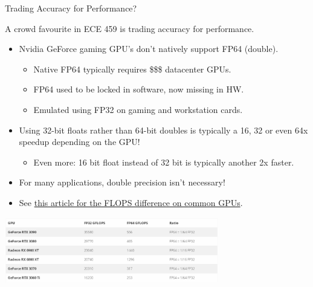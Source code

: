 \begin{frame}{Trading Accuracy for Performance?}
	
	A crowd favourite in ECE 459 is trading accuracy for performance.
	
		\begin{itemize}
		\item Nvidia GeForce gaming GPU's don't natively support FP64 (double).
		\begin{itemize}
			\item Native FP64 typically requires \$\$\$ datacenter GPUs.
			\item FP64 used to be locked in software, now missing in HW.
			\item Emulated using FP32 on gaming and workstation cards.
		\end{itemize}
		\item Using 32-bit floats rather than 64-bit doubles is typically a 16, 32 or even 64x speedup depending on the GPU!
		\begin{itemize}
			\item Even more: 16 bit float instead of 32 bit is typically another 2x faster.
		\end{itemize}
		\item For many applications, double precision isn't necessary!
		\item See \href{https://www.geeks3d.com/20140305/amd-radeon-and-nvidia-geforce-fp32-fp64-gflops-table-computing}{this article for the FLOPS difference on common GPUs}.
	\end{itemize}

	\begin{center}
		\includegraphics[width=0.70\textwidth]{images/gpu-fp32-fp64-table.png}
	\end{center}

\end{frame}



